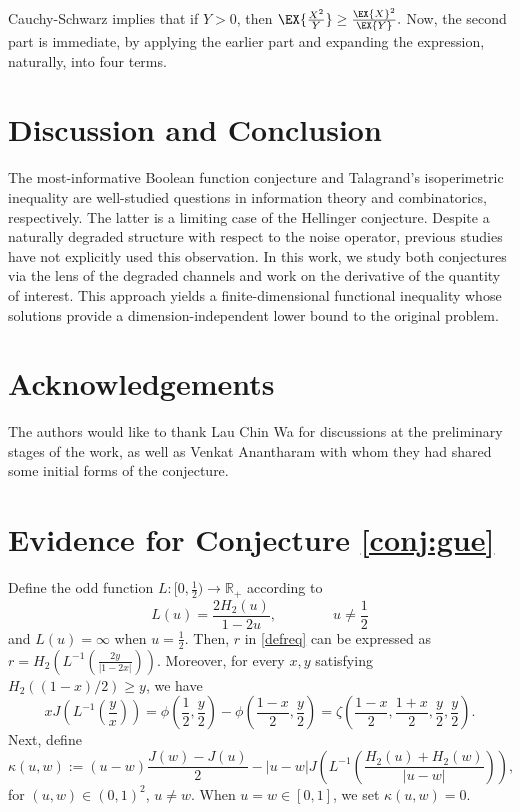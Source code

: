 \documentclass[conference,letterpaper,onecolumn]{IEEEtran}
\theoremstyle{plain}%
\begin{document}
    Cauchy-Schwarz implies that if $Y> 0$, then $\EX{\frac{X^2}{Y}} \geq \frac{\EX{X}^2}{\EX{Y}}. $ Now, the second part is immediate, by applying the earlier part and expanding the expression, naturally, into four terms. 

\section{Discussion and Conclusion}
The most-informative Boolean function conjecture and Talagrand's isoperimetric inequality are well-studied questions in information theory and combinatorics, respectively. The latter is a limiting case of the Hellinger conjecture. Despite a naturally degraded structure with respect to the noise operator, previous studies have not explicitly used this observation. In this work, we study both conjectures via the lens of the degraded channels and work on the derivative of the quantity of interest. This approach yields a finite-dimensional functional inequality whose solutions provide a dimension-independent lower bound to the original problem.

\section*{Acknowledgements}
The authors would like to thank Lau Chin Wa for discussions at the preliminary stages of the work, as well as Venkat Anantharam with whom they had shared some initial forms of the conjecture.



\thispagestyle{empty}



\thispagestyle{empty}

\appendices
\section{Evidence for Conjecture \ref{conj:gue}}
\label{appevidence}

Define the odd function $L: [0,\frac 12) \to \mathbb{R}_+$ according to $$L(u)=\frac{2H_2(u)}{1-2u},\qquad\qquad u \neq \frac 12$$ and $L(u)=\infty$ when $u=\frac 12$. Then, $r$ in \eqref{defreq} can be expressed as $r=H_2\left(L^{-1}\left(\frac{2y}{|1-2x|}\right)\right)$. Moreover, for every $x,y$ satisfying $H_2((1-x)/2)\geq y$, we have
$$xJ\left(L^{-1}\left(\frac{y}{x}\right)\right)=\phi(\frac12,\frac{y}{2})-\phi(\frac{1-x}{2},\frac{y}{2})=\zeta\left(\frac{1-x}{2},\frac{1+x}{2},\frac{y}{2},\frac{y}{2}\right).$$
Next, define
$$\kappa(u,w):=(u-w)\frac{J(w) - J(u)}{2}-|u-w|J\left(L^{-1}\left(\frac{H_2(u) + H_2(w)}{|u - w|}\right)\right),$$
for $(u,w)\in(0,1)^2$, $u\neq w$. When $u=w\in[0,1]$, we set $\kappa(u,w)=0$. 
\end{document}
